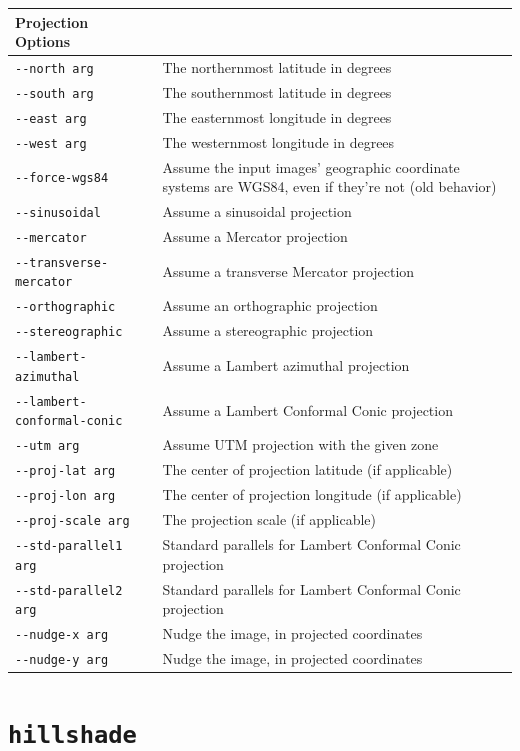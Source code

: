 \begin{longtable}{|l|p{7.5cm}|}
Projection Options\\ \hline
\verb#--north arg# & The northernmost latitude in degrees\\ \hline
\verb#--south arg# & The southernmost latitude in degrees\\ \hline
\verb#--east arg# & The easternmost longitude in degrees\\ \hline
\verb#--west arg# & The westernmost longitude in degrees\\ \hline
\verb#--force-wgs84# & Assume the input images' geographic coordinate systems are WGS84, even if they're not (old behavior)\\ \hline
\verb#--sinusoidal# & Assume a sinusoidal projection\\ \hline
\verb#--mercator# & Assume a Mercator projection\\ \hline
\verb#--transverse-mercator# & Assume a transverse Mercator projection\\ \hline
\verb#--orthographic# & Assume an orthographic projection\\ \hline
\verb#--stereographic# & Assume a stereographic projection\\ \hline
\verb#--lambert-azimuthal# & Assume a Lambert azimuthal projection\\ \hline
\verb#--lambert-conformal-conic# & Assume a Lambert Conformal Conic projection\\ \hline
\verb#--utm arg# & Assume UTM projection with the given zone\\ \hline
\verb#--proj-lat arg# & The center of projection latitude (if applicable)\\ \hline
\verb#--proj-lon arg# & The center of projection longitude (if applicable)\\ \hline
\verb#--proj-scale arg# & The projection scale (if applicable)\\ \hline
\verb#--std-parallel1 arg# & Standard parallels for Lambert Conformal Conic projection\\ \hline
\verb#--std-parallel2 arg# & Standard parallels for Lambert Conformal Conic projection\\ \hline
\verb#--nudge-x arg# & Nudge the image, in projected coordinates\\ \hline
\verb#--nudge-y arg# & Nudge the image, in projected coordinates\\ \hline
\end{longtable}

\section{{\tt hillshade}}\label{sec:hillqshade}

